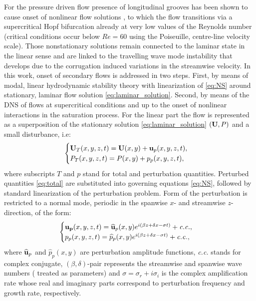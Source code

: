 \documentclass[lineno]{jfm}
\begin{document}
For the pressure driven flow presence of longitudinal grooves has been shown to cause onset of nonlinear flow solutions \citep{Nikesh2017,Nikesh2018,moradi2019flow}, to which the flow transitions via a supercritical Hopf bifurcation \citep{Gepner2020} already at very low values of the Reynolds number (critical conditions occur below $Re=60$ using the Poiseuille, centre-line velocity scale).
Those nonstationary solutions remain connected to the laminar state in the linear sense and are linked to the travelling wave mode instability that develops due to the corrugation induced variations in the streamwise velocity.
In this work, onset of secondary flows is addressed in two steps.
First, by means of modal, linear hydrodynamic stability theory with linearization of \eqref{eq:NS} around stationary, laminar flow solution \eqref{eq:laminar_solution}.
Second, by means of the DNS of flows at supercritical conditions and up to the onset of nonlinear interactions in the saturation process. 
For the linear part the flow is represented as a superposition of the stationary solution \eqref{eq:laminar_solution} $({\bf U}, P)$ and a small disturbance, i.e:
\begin{equation}
    \begin{cases}
        {\bf U}_T(x,y,z,t)={\bf U}(x,y)+{\bf u}_p(x,y,z,t), \\
        P_T(x,y,z,t)      = P(x,y)+p_p(x,y,z,t),
    \end{cases}
    \label{eq:total}
\end{equation}
where subscripts $T$ and $p$ stand for total and perturbation quantities.
Perturbed quantities \eqref{eq:total} are substituted into governing equations \eqref{eq:NS}, followed by standard linearization of the perturbation problem.
Form of the perturbation is restricted to a normal mode, periodic in the spanwise $x$- and streamwise $z$-direction, of the form:
\begin{equation}
    \begin{cases}
        {\bf u_p}(x,y,z,t)={\bf \widehat{u}}_p(x,y)e^{i(\beta z + \delta x - \sigma t)}+{\it c.c.}, \\
        p_p(x,y,z,t) = \widehat{p}_p(x,y)e^{i(\beta z + \delta x - \sigma t)}+{\it c.c.},
    \end{cases}
    \label{eq:normal_mode}
\end{equation}
where ${\bf \widehat{u}}_p$ and $\widehat{p}_p(x,y)$ are perturbation amplitude functions, \textit{c.c.} stands for complex conjugate, $(\beta, \delta)$-pair represents the streamwise and spanwise wave numbers ( treated as parameters) and $\sigma=\sigma_r+i\sigma_i$ is the complex amplification rate whose real and imaginary parts correspond to perturbation frequency and growth rate, respectively.
\end{document}
